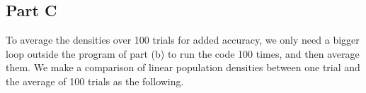 \documentclass{article}
\begin{document}
\subsection{Part C}
\quad To average the densities over 100 trials for added accuracy, we only need a bigger loop outside the program of part (b) to run the code 100 times, and then average them. We make a comparison of linear population densities between one trial and the average of 100 trials as the following.
\begin{figure}[!ht]
	\centering
\end{figure}
\end{document}
